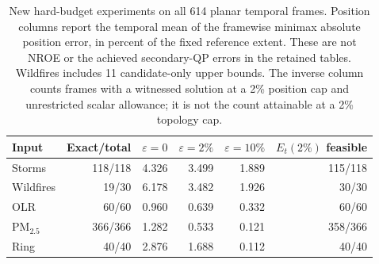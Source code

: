 \begin{table}[t]
\caption{New hard-budget experiments on all 614 planar temporal frames. Position columns report the temporal mean of the framewise minimax absolute position error, in percent of the fixed reference extent. These are not NROE or the achieved secondary-QP errors in the retained tables. Wildfires includes 11 candidate-only upper bounds. The inverse column counts frames with a witnessed solution at a 2\% position cap and unrestricted scalar allowance; it is not the count attainable at a 2\% topology cap.}\label{tab:budget_results}
\centering\small
\begin{tabular}{lrrrrr}\toprule
Input & Exact/total & $\varepsilon=0$ & $\varepsilon=2\%$ & $\varepsilon=10\%$ & $E_t(2\%)$ feasible\\\midrule
Storms & 118/118 & 4.326 & 3.499 & 1.889 & 115/118 \\
Wildfires & 19/30 & 6.178 & 3.482 & 1.926 & 30/30 \\
OLR & 60/60 & 0.960 & 0.639 & 0.332 & 60/60 \\
PM$_{2.5}$ & 366/366 & 1.282 & 0.533 & 0.121 & 358/366 \\
Ring & 40/40 & 2.876 & 1.688 & 0.112 & 40/40 \\
\bottomrule\end{tabular}
\end{table}
